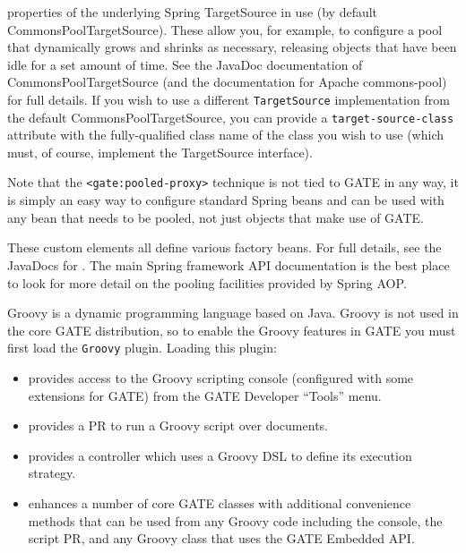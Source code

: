 properties of the underlying Spring TargetSource in use (by default
CommonsPoolTargetSource).  These allow you, for example, to configure a pool
that dynamically grows and shrinks as necessary, releasing objects that have
been idle for a set amount of time.  See the
%
{JavaDoc documentation of CommonsPoolTargetSource} (and the documentation for
Apache commons-pool) for full details.  If you wish to use a different
\verb|TargetSource| implementation from the default CommonsPoolTargetSource,
you can provide a \verb|target-source-class| attribute with the fully-qualified
class name of the class you wish to use (which must, of course, implement the
TargetSource interface).

Note that the \verb|<gate:pooled-proxy>| technique is not tied to GATE in any
way, it is simply an easy way to configure standard Spring beans and can be
used with any bean that needs to be pooled, not just objects that make use of
GATE.


These custom elements all define various factory beans.  For full details, see
the JavaDocs for \texttt{}.
The main Spring framework API documentation is the best place to look for more
detail on the pooling facilities provided by Spring AOP.


Groovy is a dynamic programming language based on Java. Groovy is not used in
the core GATE distribution, so to enable the Groovy features in GATE you must
first load the \verb|Groovy| plugin.  Loading this plugin:
\begin{itemize}
\item provides access to the Groovy scripting console (configured with some
  extensions for GATE) from the GATE Developer ``Tools'' menu.
\item provides a PR to run a Groovy script over documents.
\item provides a controller which uses a Groovy DSL to define its execution
  strategy.
\item enhances a number of core GATE classes with additional convenience
  methods that can be used from any Groovy code including the console, the
  script PR, and any Groovy class that uses the GATE Embedded API.
\end{itemize}
    

